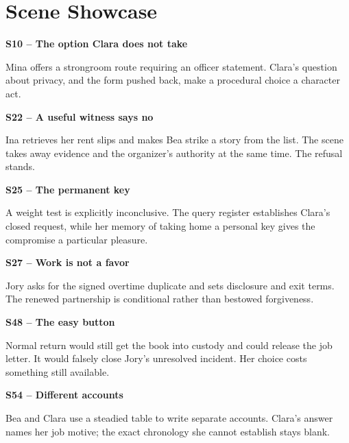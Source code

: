 \section{Scene Showcase}
\begingroup
\renewcommand{\scenecard}[2]{\noindent\textbf{#1}\par #2\par\vspace{7pt}}
\scenecard{S10 -- The option Clara does not take}{Mina offers a strongroom route requiring an officer statement. Clara's question about privacy, and the form pushed back, make a procedural choice a character act.}
\scenecard{S22 -- A useful witness says no}{Ina retrieves her rent slips and makes Bea strike a story from the list. The scene takes away evidence and the organizer's authority at the same time. The refusal stands.}
\scenecard{S25 -- The permanent key}{A weight test is explicitly inconclusive. The query register establishes Clara's closed request, while her memory of taking home a personal key gives the compromise a particular pleasure.}
\scenecard{S27 -- Work is not a favor}{Jory asks for the signed overtime duplicate and sets disclosure and exit terms. The renewed partnership is conditional rather than bestowed forgiveness.}
\scenecard{S48 -- The easy button}{Normal return would still get the book into custody and could release the job letter. It would falsely close Jory's unresolved incident. Her choice costs something still available.}
\scenecard{S54 -- Different accounts}{Bea and Clara use a steadied table to write separate accounts. Clara's answer names her job motive; the exact chronology she cannot establish stays blank.}

\endgroup
